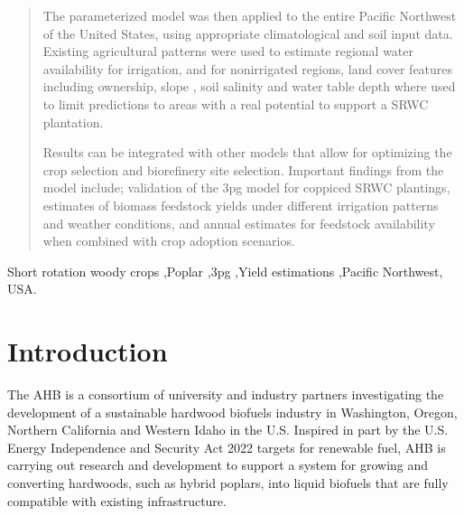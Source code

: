 \documentclass[preprint,12pt]{elsarticle}
\begin{document}
\begin{frontmatter}
\begin{abstract}
  The parameterized model was then applied to the entire Pacific
  Northwest of the United States, using appropriate climatological and
  soil input data.  Existing agricultural patterns were used to
  estimate regional water availability for irrigation, and for
  nonirrigated regions, land cover features including ownership,
  slope , soil salinity and water table depth where used to limit
  predictions to areas with a real potential to support a \ac{SRWC}
  plantation.

  Results can be integrated with other models that allow for
  optimizing the crop selection and biorefinery site selection.
  Important findings from the model include; validation of the
  \ac{3pg} model for coppiced \ac{SRWC} plantings, estimates of
  biomass feedstock yields under different irrigation patterns and
  weather conditions, and annual estimates for feedstock availability
  when combined with crop adoption scenarios.

\end{abstract}

\begin{keyword}
  Short rotation woody crops \sep Poplar \sep \ac{3pg} \sep Yield
  estimations \sep Pacific Northwest, USA.



\end{keyword}

\end{frontmatter}


\section{Introduction}
\label{sec:introduction}
The \acf{AHB} is a consortium of university and industry partners
investigating the development of a sustainable hardwood biofuels
industry in Washington, Oregon, Northern California and Western Idaho
in the U.S.  Inspired in part by the U.S. Energy Independence and
Security Act 2022 targets for renewable fuel, \ac{AHB} is carrying out
research and development to support a system for growing and
converting hardwoods, such as hybrid poplars, into liquid biofuels
that are fully compatible with existing infrastructure.
\end{document}
